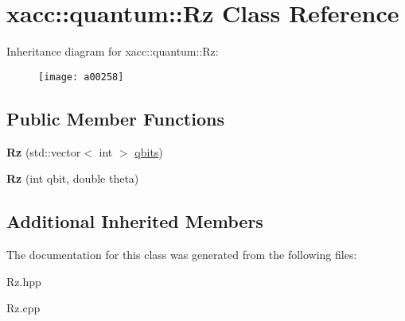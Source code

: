 \hypertarget{a00258}{}\section{xacc\+:\+:quantum\+:\+:Rz Class Reference}
\label{a00258}
Inheritance diagram for xacc\+:\+:quantum\+:\+:Rz\+:\begin{figure}[H]
\begin{center}
\leavevmode
\texttt{[image: a00258]}
\end{center}
\end{figure}
\subsection*{Public Member Functions}
\begin{DoxyCompactItemize}
\item 
{\bfseries Rz} (std\+::vector$<$ int $>$ \hyperlink{a00112_a2a56be6c2519ea65df4d06f4abae1393}{qbits})\hypertarget{a00258_a7ce912c7f9c9e8f4e7e60f9dba95538b}{}\label{a00258_a7ce912c7f9c9e8f4e7e60f9dba95538b}

\item 
{\bfseries Rz} (int qbit, double theta)\hypertarget{a00258_ae30eaf75feb8f896c22043629d21b834}{}\label{a00258_ae30eaf75feb8f896c22043629d21b834}

\end{DoxyCompactItemize}
\subsection*{Additional Inherited Members}


The documentation for this class was generated from the following files\+:\begin{DoxyCompactItemize}
\item 
Rz.\+hpp\item 
Rz.\+cpp\end{DoxyCompactItemize}
